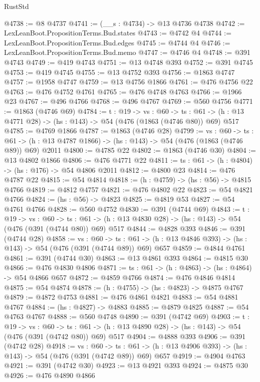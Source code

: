 \begin{lexlean}{RustStd}
\begin{coremodule}
@4738 := @8 @4737
@4741 := (__s : @4734) -> @13 @4736 @4738
@4742 := LexLeanBoot.PropositionTerms.Bud.states
@4743 := @4742 @4
@4744 := LexLeanBoot.PropositionTerms.Bud.edges
@4745 := @4744 @4
@4746 := LexLeanBoot.PropositionTerms.Bud.memo
@4747 := @4746 @4
@4748 := @391 @4743
@4749 := @419 @4743
@4751 := @13 @4748 @393
@4752 := @391 @4745
@4753 := @419 @4745
@4755 := @13 @4752 @393
@4756 := @1863 @4747
@4757 := @1958 @4747
@4759 := @13 @4756 @1866
@4761 := @476 @4756 @22
@4763 := @476 @4752 @4761
@4765 := @476 @4748 @4763
@4766 := @1966 @23
@4767 := @496 @4766
@4768 := @496 @4767
@4769 := @560 @4756
@4771 := @1863 (@4746 @69)
@4784 := {t : @19} ->
  {vs : @60} ->
  {ts : @61} -> (h : @13 @4771 @28) -> (hs : @143) -> @54 (@476 (@1863 (@4746 @80)) @69) @517
@4785 := @4769 @1866
@4787 := @1863 (@4746 @28)
@4799 := {vs : @60} ->
  {ts : @61} -> (h : @13 @4787 @1866) -> (hs : @143) -> @54 (@476 (@1863 (@4746 @89)) @69) @2011
@4800 := @4785 @22
@4802 := @1863 (@4746 @30)
@4804 := @13 @4802 @1866
@4806 := @476 @4771 @22
@4811 := {ts : @61} -> (h : @4804) -> (hs : @176) -> @54 @4806 @2011
@4812 := @4800 @23
@4814 := @476 @4787 @22
@4815 := @54 @4814
@4818 := (h : @4759) -> (hs : @56) -> @4815 @4766
@4819 := @4812 @4757
@4821 := @476 @4802 @22
@4823 := @54 @4821 @4766
@4824 := (hs : @56) -> @4823
@4825 := @4819 @53
@4827 := @54 @4761 @4766
@4828 := @560 @4752
@4830 := @391 (@4744 @69)
@4843 := {t : @19} ->
  {vs : @60} ->
  {ts : @61} -> (h : @13 @4830 @28) -> (hs : @143) -> @54 (@476 (@391 (@4744 @80)) @69) @517
@4844 := @4828 @393
@4846 := @391 (@4744 @28)
@4858 := {vs : @60} ->
  {ts : @61} -> (h : @13 @4846 @393) -> (hs : @143) -> @54 (@476 (@391 (@4744 @89)) @69) @657
@4859 := @4844 @4761
@4861 := @391 (@4744 @30)
@4863 := @13 @4861 @393
@4864 := @4815 @30
@4866 := @476 @4830 @4806
@4871 := {ts : @61} -> (h : @4863) -> (hs : @4864) -> @54 @4866 @657
@4872 := @4859 @4766
@4874 := @476 @4846 @4814
@4875 := @54 @4874
@4878 := (h : @4755) -> (hs : @4823) -> @4875 @4767
@4879 := @4872 @4753
@4881 := @476 @4861 @4821
@4883 := @54 @4881 @4767
@4884 := (hs : @4827) -> @4883
@4885 := @4879 @4825
@4887 := @54 @4763 @4767
@4888 := @560 @4748
@4890 := @391 (@4742 @69)
@4903 := {t : @19} ->
  {vs : @60} ->
  {ts : @61} -> (h : @13 @4890 @28) -> (hs : @143) -> @54 (@476 (@391 (@4742 @80)) @69) @517
@4904 := @4888 @393
@4906 := @391 (@4742 @28)
@4918 := {vs : @60} ->
  {ts : @61} -> (h : @13 @4906 @393) -> (hs : @143) -> @54 (@476 (@391 (@4742 @89)) @69) @657
@4919 := @4904 @4763
@4921 := @391 (@4742 @30)
@4923 := @13 @4921 @393
@4924 := @4875 @30
@4926 := @476 @4890 @4866

\end{coremodule}
\end{lexlean}
